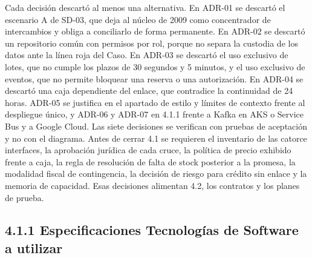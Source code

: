 \documentclass[11pt]{article}
\begin{document}
Cada decisión descartó al menos una alternativa. En ADR-01 se descartó el escenario A de SD-03, que deja al núcleo de 2009 como concentrador de intercambios y obliga a conciliarlo de forma permanente. En ADR-02 se descartó un repositorio común con permisos por rol, porque no separa la custodia de los datos ante la línea roja del Caso. En ADR-03 se descartó el uso exclusivo de lotes, que no cumple los plazos de 30 segundos y 5 minutos, y el uso exclusivo de eventos, que no permite bloquear una reserva o una autorización. En ADR-04 se descartó una caja dependiente del enlace, que contradice la continuidad de 24 horas. ADR-05 se justifica en el apartado de estilo y límites de contexto frente al despliegue único, y ADR-06 y ADR-07 en 4.1.1 frente a Kafka en AKS o Service Bus y a Google Cloud. Las siete decisiones se verifican con pruebas de aceptación y no con el diagrama. Antes de cerrar 4.1 se requieren el inventario de las catorce interfaces, la aprobación jurídica de cada cruce, la política de precio exhibido frente a caja, la regla de resolución de falta de stock posterior a la promesa, la modalidad fiscal de contingencia, la decisión de riesgo para crédito sin enlace y la memoria de capacidad. Esas decisiones alimentan 4.2, los contratos y los planes de prueba.

\subsection{4.1.1 Especificaciones Tecnologías de Software a utilizar}
\end{document}
